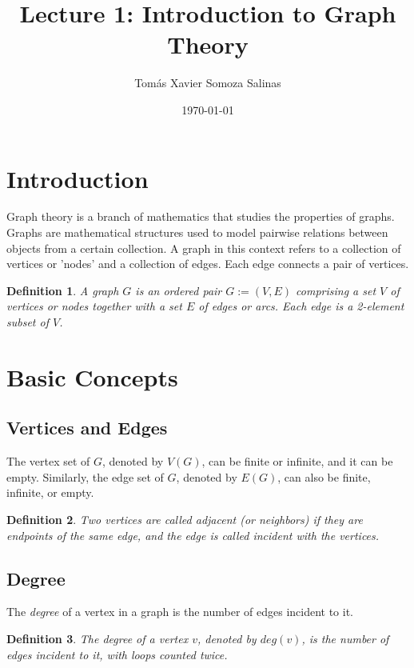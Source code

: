 \documentclass{article}
\newtheorem{definition}{Definition}
\begin{document}
	
	\title{Lecture 1: Introduction to Graph Theory}
	\author{Tomás Xavier Somoza Salinas}
	\date{\today}
	\maketitle
	
	\section{Introduction}
	Graph theory is a branch of mathematics that studies the properties of graphs. Graphs are mathematical structures used to model pairwise relations between objects from a certain collection. A graph in this context refers to a collection of vertices or 'nodes' and a collection of edges. Each edge connects a pair of vertices.
	
	\begin{definition}
		A \textit{graph} \(G\) is an ordered pair \(G := (V, E)\) comprising a set \(V\) of vertices or nodes together with a set \(E\) of edges or arcs. Each edge is a 2-element subset of \(V\).
	\end{definition}
	
	\section{Basic Concepts}
	
	\subsection{Vertices and Edges}
	The vertex set of \(G\), denoted by \(V(G)\), can be finite or infinite, and it can be empty. Similarly, the edge set of \(G\), denoted by \(E(G)\), can also be finite, infinite, or empty.
	
	\begin{definition}
		Two vertices are called \textit{adjacent} (or \textit{neighbors}) if they are endpoints of the same edge, and the edge is called \textit{incident} with the vertices.
	\end{definition}
	
	\subsection{Degree}
	The \textit{degree} of a vertex in a graph is the number of edges incident to it.
	
	\begin{definition}
		The \textit{degree} of a vertex \(v\), denoted by \(deg(v)\), is the number of edges incident to it, with loops counted twice.
	\end{definition}
	
\end{document}
